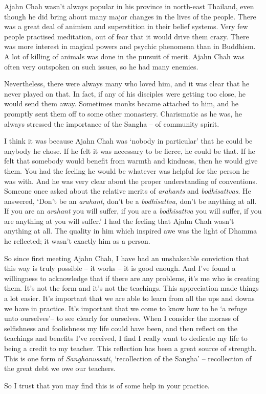 Ajahn Chah wasn't always popular in his province in north-east Thailand, 
even though he did bring about many major changes in the lives of the
people. There was a great deal of animism and superstition in their
belief systems. Very few people practised meditation, out of fear that
it would drive them crazy. There was more interest in magical powers and
psychic phenomena than in Buddhism. A lot of killing of animals was done
in the pursuit of merit. Ajahn Chah was often very outspoken on such
issues, so he had many enemies. 

Nevertheless, there were always many who loved him, and it was clear
that he never played on that. In fact, if any of his disciples were
getting too close, he would send them away. Sometimes monks became
attached to him, and he promptly sent them off to some other monastery. 
Charismatic as he was, he always stressed the importance of the Sangha
-- of community spirit. 

I think it was because Ajahn Chah was `nobody in particular' that he
could be anybody he chose. If he felt it was necessary to be fierce, he
could be that. If he felt that somebody would benefit from warmth and
kindness, then he would give them. You had the feeling he would be
whatever was helpful for the person he was with. And he was very clear
about the proper understanding of conventions. Someone once asked about
the relative merits of \emph{arahants} and \emph{bodhisattvas}. He
answered, `Don't be an \emph{arahant}, don't be a \emph{bodhisattva}, 
don't be anything at all. If you are an \emph{arahant} you will suffer, 
if you are a \emph{bodhisattva} you will suffer, if you are anything at
you will suffer.' I had the feeling that Ajahn Chah wasn't anything at
all. The quality in him which inspired awe was the light of Dhamma he
reflected; it wasn't exactly him as a person. 

So since first meeting Ajahn Chah, I have had an unshakeable conviction
that this way is truly possible -- it works -- it is good enough. And
I've found a willingness to acknowledge that if there are any problems, 
it's me who is creating them. It's not the form and it's not the
teachings. This appreciation made things a lot easier. It's important
that we are able to learn from all the ups and downs we have in
practice. It's important that we come to know how to be `a refuge unto
ourselves'-- to see clearly for ourselves. When I consider the morass of
selfishness and foolishness my life could have been, and then reflect on
the teachings and benefits I've received, I find I really want to
dedicate my life to being a credit to my teacher. This reflection has
been a great source of strength. This is one form of
\emph{Sanghānussati}, `recollection of the Sangha' -- recollection of
the great debt we owe our teachers. 

So I trust that you may find this is of some help in your practice.


